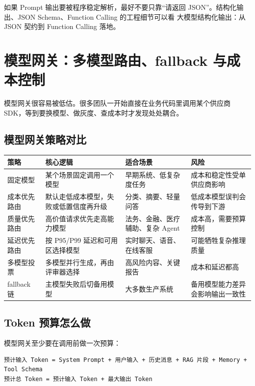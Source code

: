 \documentclass[10pt,a4paper]{ctexart}
\begin{document}
如果 Prompt 输出要被程序稳定解析，最好不要只靠“请返回 JSON”。结构化输出、JSON Schema、Function Calling 的工程细节可以看 大模型结构化输出：从 JSON 契约到 Function Calling 落地。



\section{模型网关：多模型路由、fallback 与成本控制}


模型网关很容易被低估。很多团队一开始直接在业务代码里调用某个供应商 SDK，等到要换模型、做灰度、查成本时才发现处处耦合。



\subsection{模型网关策略对比}

{\footnotesize
\begin{tabularx}{\textwidth}{|X|X|X|X|}
\hline
\textbf{策略} & \textbf{核心逻辑} & \textbf{适合场景} & \textbf{风险} \\
\hline
固定模型 & 某个场景固定调用一个模型 & 早期系统、低复杂度任务 & 成本和稳定性受单供应商影响 \\
\hline
成本优先路由 & 默认走低成本模型，失败或低置信度再升级 & 分类、摘要、轻量问答 & 低成本模型误判会传导到下游 \\
\hline
质量优先路由 & 高价值请求优先走高能力模型 & 法务、金融、医疗辅助、复杂 Agent & 成本高，需要预算控制 \\
\hline
延迟优先路由 & 按 P95/P99 延迟和可用区选择模型 & 实时聊天、语音、在线客服 & 可能牺牲复杂推理质量 \\
\hline
多模型投票 & 多模型并行生成，再由评审器选择 & 高风险内容、关键报告 & 成本和延迟都高 \\
\hline
fallback 链 & 主模型失败后切备用模型 & 大多数生产系统 & 备用模型能力差异会影响输出一致性 \\
\hline
\end{tabularx}
}



\subsection{Token 预算怎么做}


模型网关至少要在调用前做一次预算：



\begin{lstlisting}
预计输入 Token = System Prompt + 用户输入 + 历史消息 + RAG 片段 + Memory + Tool Schema
预计总 Token = 预计输入 Token + 最大输出 Token
\end{lstlisting}
\end{document}
